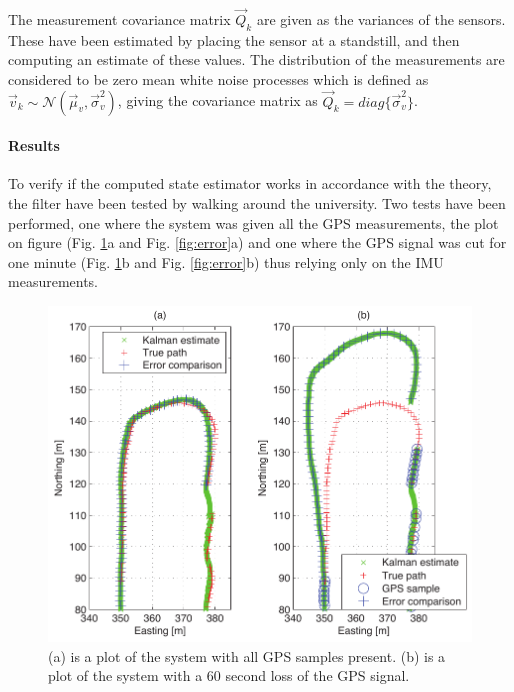 \documentclass[a0,portrait]{a0poster}
\begin{document}
\begin{center}
{\paragraph{}
The measurement covariance matrix $\vec{Q}_k$ are given as the variances of the sensors. These have been estimated by placing the sensor at a standstill, and then computing an estimate of these values. The distribution of the measurements are considered to be zero mean white noise processes which is defined as $\vec{v}_k \sim \mathcal{N}(\vec{\mu}_v,\vec{\sigma}^2_v)$, giving the covariance matrix as $\vec{Q}_k = diag\{\vec{\sigma}^2_v\}$. 

\paragraph{Results}
To verify if the computed state estimator works in accordance with the theory, the filter have been tested by walking around the university. Two tests have been performed, one where the system was given all the GPS measurements, the plot on figure (Fig. \ref{fig:path}a and Fig. \ref{fig:error}a) and one where the GPS signal was cut for one minute (Fig. \ref{fig:path}b and Fig. \ref{fig:error}b) thus relying only on the IMU measurements.
\begin{figure}
	\centering %
	\includegraphics[width=\threecolwidth]{img/track}
  	\caption{(a) is a plot of the system with all GPS samples present. (b) is a plot of the system with a 60 second loss of the GPS signal.}
	\label{fig:path}
\end{figure}
}
\end{center}
\end{document}

